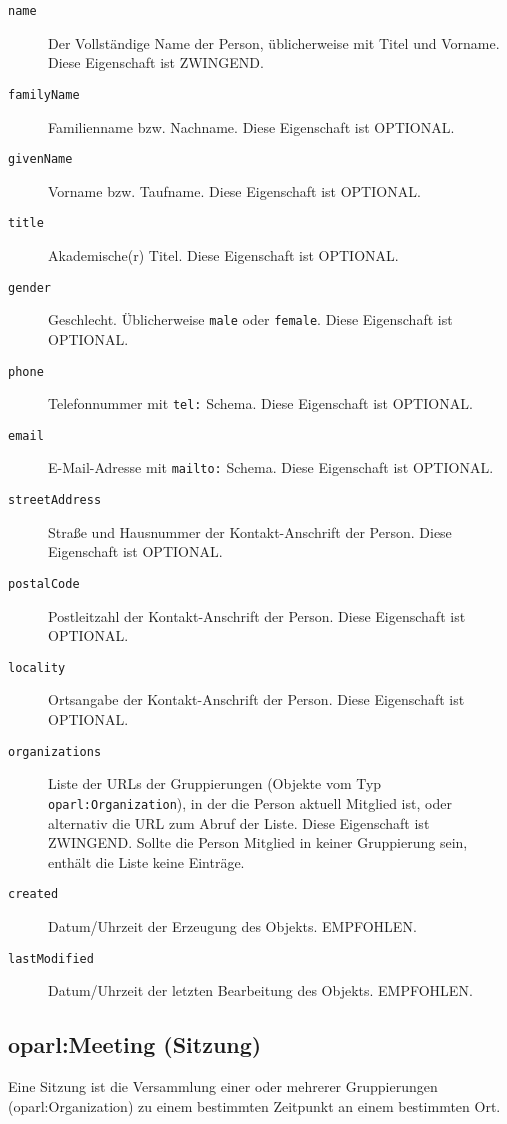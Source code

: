 \documentclass[,a4paper]{article}
\begin{document}
\begin{description}
\item[\texttt{name}]
Der Vollständige Name der Person, üblicherweise mit Titel und Vorname.
Diese Eigenschaft ist ZWINGEND.
\item[\texttt{familyName}]
Familienname bzw. Nachname. Diese Eigenschaft ist OPTIONAL.
\item[\texttt{givenName}]
Vorname bzw. Taufname. Diese Eigenschaft ist OPTIONAL.
\item[\texttt{title}]
Akademische(r) Titel. Diese Eigenschaft ist OPTIONAL.
\item[\texttt{gender}]
Geschlecht. Üblicherweise \texttt{male} oder \texttt{female}. Diese
Eigenschaft ist OPTIONAL.
\item[\texttt{phone}]
Telefonnummer mit \texttt{tel:} Schema. Diese Eigenschaft ist OPTIONAL.
\item[\texttt{email}]
E-Mail-Adresse mit \texttt{mailto:} Schema. Diese Eigenschaft ist
OPTIONAL.
\item[\texttt{streetAddress}]
Straße und Hausnummer der Kontakt-Anschrift der Person. Diese
Eigenschaft ist OPTIONAL.
\item[\texttt{postalCode}]
Postleitzahl der Kontakt-Anschrift der Person. Diese Eigenschaft ist
OPTIONAL.
\item[\texttt{locality}]
Ortsangabe der Kontakt-Anschrift der Person. Diese Eigenschaft ist
OPTIONAL.
\item[\texttt{organizations}]
Liste der URLs der Gruppierungen (Objekte vom Typ
\texttt{oparl:Organization}), in der die Person aktuell Mitglied ist,
oder alternativ die URL zum Abruf der Liste. Diese Eigenschaft ist
ZWINGEND. Sollte die Person Mitglied in keiner Gruppierung sein, enthält
die Liste keine Einträge.
\item[\texttt{created}]
Datum/Uhrzeit der Erzeugung des Objekts. EMPFOHLEN.
\item[\texttt{lastModified}]
Datum/Uhrzeit der letzten Bearbeitung des Objekts. EMPFOHLEN.
\end{description}

\subsection{oparl:Meeting (Sitzung)}\label{oparlux5fmeeting}

Eine Sitzung ist die Versammlung einer oder mehrerer Gruppierungen
(oparl:Organization) zu einem bestimmten Zeitpunkt an einem bestimmten
Ort.
\end{document}
